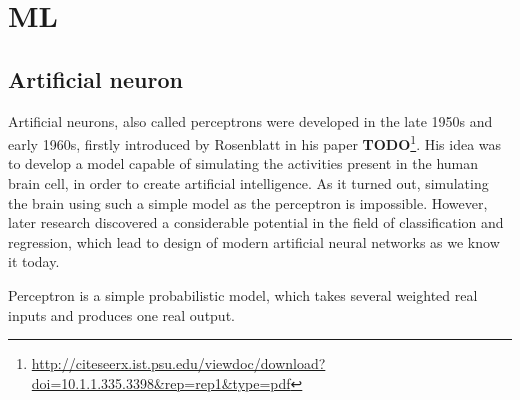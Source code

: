 \chapter{ML}

\section{Artificial neuron}

Artificial neurons, also called perceptrons were developed in the late 1950s and early 1960s, firstly introduced by Rosenblatt in his paper \textbf{TODO}\footnote{\url{http://citeseerx.ist.psu.edu/viewdoc/download?doi=10.1.1.335.3398&rep=rep1&type=pdf}}. His idea was to develop a model capable of simulating the activities present in the human brain cell, in order to create artificial intelligence. As it turned out, simulating the brain using such a simple model as the perceptron is impossible. However, later research discovered a considerable potential in the field of classification and regression, which lead to design of modern artificial neural networks as we know it today.

Perceptron is a simple probabilistic model, which takes several weighted real inputs and produces one real output.

\vspace{3mm}

